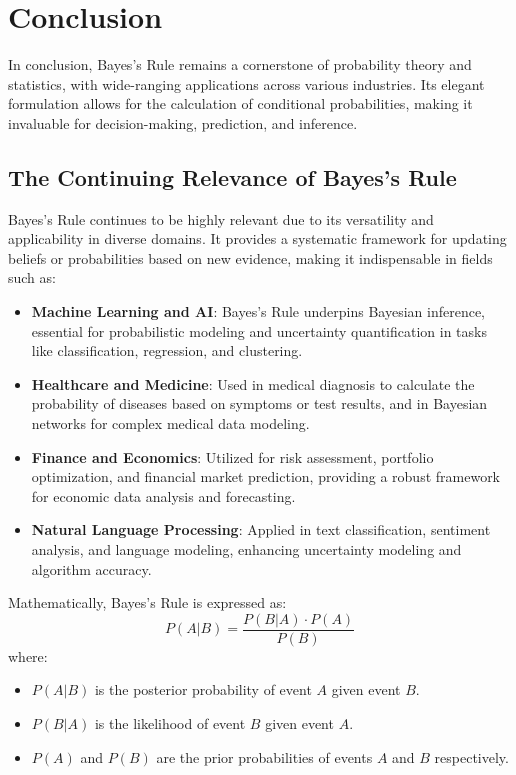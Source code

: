 \documentclass[12pt]{book} %
\begin{document}
\section{Conclusion}
In conclusion, Bayes's Rule remains a cornerstone of probability theory and statistics, with wide-ranging applications across various industries. Its elegant formulation allows for the calculation of conditional probabilities, making it invaluable for decision-making, prediction, and inference.

\subsection{The Continuing Relevance of Bayes's Rule}
Bayes's Rule continues to be highly relevant due to its versatility and applicability in diverse domains. It provides a systematic framework for updating beliefs or probabilities based on new evidence, making it indispensable in fields such as:

\begin{itemize}
    \item \textbf{Machine Learning and AI}: Bayes's Rule underpins Bayesian inference, essential for probabilistic modeling and uncertainty quantification in tasks like classification, regression, and clustering.
    
    \item \textbf{Healthcare and Medicine}: Used in medical diagnosis to calculate the probability of diseases based on symptoms or test results, and in Bayesian networks for complex medical data modeling.
    
    \item \textbf{Finance and Economics}: Utilized for risk assessment, portfolio optimization, and financial market prediction, providing a robust framework for economic data analysis and forecasting.
    
    \item \textbf{Natural Language Processing}: Applied in text classification, sentiment analysis, and language modeling, enhancing uncertainty modeling and algorithm accuracy.
\end{itemize}

Mathematically, Bayes's Rule is expressed as:
\begin{equation*}
    P(A|B) = \frac{P(B|A) \cdot P(A)}{P(B)}
\end{equation*}
where:
\begin{itemize}
    \item \(P(A|B)\) is the posterior probability of event \(A\) given event \(B\).
    \item \(P(B|A)\) is the likelihood of event \(B\) given event \(A\).
    \item \(P(A)\) and \(P(B)\) are the prior probabilities of events \(A\) and \(B\) respectively.
\end{itemize}
\end{document}
